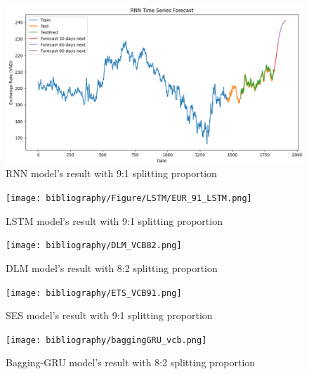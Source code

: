 \documentclass{ieeeojies}
\begin{document}
\begin{figure}[H]
  \centering
  \begin{minipage}{0.8\linewidth}
    \centering
    \includegraphics[width=\linewidth]{RNN_EUR.png}
    \caption{RNN model's result with 9:1 splitting proportion}
    \label{fig12}
  \end{minipage}
\end{figure}
\begin{figure}[H]
  \centering
  \begin{minipage}{0.8\linewidth}
    \centering
    \texttt{[image: bibliography/Figure/LSTM/EUR\_91\_LSTM.png]}
    \caption{LSTM model's result with 9:1 splitting proportion}
    \label{fig8}
  \end{minipage}
\end{figure}
\begin{figure}[H]
  \centering
  \begin{minipage}{0.8\linewidth}
    \centering
    \texttt{[image: bibliography/DLM\_VCB82.png]}
    \caption{DLM model's result with 8:2 splitting proportion}
    \label{fig13}
  \end{minipage}
\end{figure}
\begin{figure}[H]
  \centering
  \begin{minipage}{0.8\linewidth}
    \centering
    \texttt{[image: bibliography/ETS\_VCB91.png]}
    \caption{SES model's result with 9:1 splitting proportion}
    \label{fig14}
  \end{minipage}
\end{figure}
\begin{figure}[H]
  \centering
  \begin{minipage}{0.8\linewidth}
    \centering
    \texttt{[image: bibliography/baggingGRU\_vcb.png]}
    \caption{Bagging-GRU model's result with 8:2 splitting proportion}
    \label{bagginggru}
  \end{minipage}
\end{figure}
\end{document}
